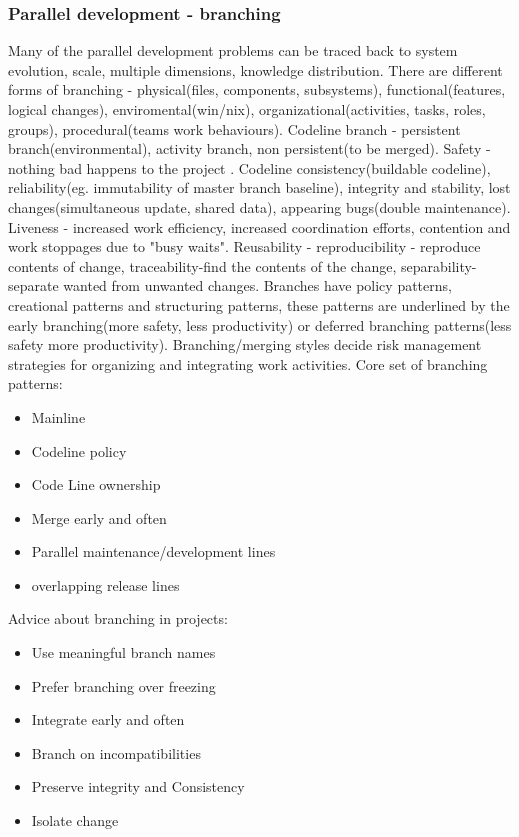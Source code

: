 \documentclass{article}
\begin{document}
\subsubsection{Parallel development - branching}
Many of the parallel development problems can be traced back to system evolution, scale, multiple dimensions, knowledge distribution.
There are different forms of branching - physical(files, components, subsystems), functional(features, logical changes), enviromental(win/nix), organizational(activities, tasks, roles, groups), procedural(teams work behaviours).
Codeline branch - persistent branch(environmental), activity branch, non persistent(to be merged).
Safety - nothing bad happens to the project . Codeline consistency(buildable codeline), reliability(eg. immutability of master branch baseline),
integrity and stability, lost changes(simultaneous update, shared data), appearing bugs(double maintenance).
Liveness - increased work efficiency, increased coordination efforts, contention and work stoppages due to "busy waits".
Reusability - reproducibility - reproduce contents of change, traceability-find the contents of the change, separability-separate wanted from unwanted changes.
Branches have policy patterns, creational patterns and structuring patterns, these patterns are underlined by the early branching(more safety, less productivity) or deferred branching patterns(less safety more productivity).
Branching/merging styles decide risk management strategies for organizing and integrating work activities.
Core set of branching patterns:
\begin{itemize}
    \item Mainline
    \item Codeline policy
    \item Code Line ownership
    \item Merge early and often
    \item Parallel maintenance/development lines
    \item overlapping release lines
\end{itemize}

Advice about branching in projects:
\begin{itemize}
    \item Use meaningful branch names
    \item Prefer branching over freezing
    \item Integrate early and often
    \item Branch on incompatibilities
    \item Preserve integrity and Consistency
    \item Isolate change
\end{itemize}
\end{document}
